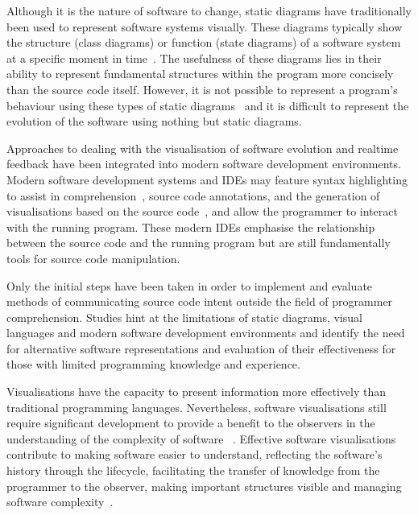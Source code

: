Although it is the nature of software to change, static diagrams have traditionally been used to represent software systems visually. These diagrams typically show the structure (class diagrams) or function (state diagrams) of a software system at a specific moment in time~\cite{Rumbaugh2004}. The usefulness of these diagrams lies in their ability to represent fundamental structures within the program more concisely than the source code itself. However, it is not possible to represent a program's behaviour using these types of static diagrams~\cite{Baecker1998} and it is difficult to represent the evolution of the software using nothing but static diagrams.


Approaches to dealing with the visualisation of software evolution and realtime feedback have been integrated into modern software development environments. Modern software development systems and \acp{IDE} may feature syntax highlighting to assist in comprehension~\cite{Chen2005,Reis}, source code annotations, and the generation of visualisations based on the source code~\cite{Hendrix2004}, and allow the programmer to interact with the running program. These modern \acp{IDE} emphasise the relationship between the source code and the running program but are still fundamentally tools for source code manipulation. 

Only the initial steps have been taken in order to implement and evaluate methods of communicating source code intent outside the field of programmer comprehension. Studies hint at the limitations of static diagrams, visual languages and modern software development environments and identify the need for alternative software representations and evaluation of their effectiveness for those with limited programming knowledge and experience. 

Visualisations have the capacity to present information more effectively than traditional programming languages. Nevertheless, software visualisations still require significant development to provide a benefit to the observers in the understanding of the complexity of software ~\cite{Baecker1995}. Effective software visualisations contribute to making software easier to understand, reflecting the software's history through the lifecycle, facilitating the transfer of knowledge from the programmer to the observer, making important structures visible and managing software complexity~\cite{Baecker1995}.

